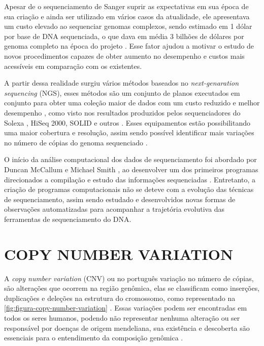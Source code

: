 Apesar de o sequenciamento de Sanger suprir as expectativas em sua época de sua criação e ainda ser utilizado em vários casos da atualidade, ele apresentava um custo elevado ao sequenciar genomas complexos, sendo estimado em 1 dólar por base de DNA sequenciada, o que dava em média 3 bilhões de dólares por genoma completo na época do projeto \cite{HutchisonIII2007}. Esse fator ajudou a motivar o estudo de novos procedimentos capazes de obter aumento no desempenho e custos mais acessíveis em comparação com os existentes.

A partir dessa realidade surgiu vários métodos baseados no \textit{next-genaration sequencing} (NGS), esses métodos são um conjunto de planos executados em conjunto para obter uma coleção maior de dados com um custo reduzido e melhor desempenho \cite{Metzker2010,Zhao2013}, como visto nos resultados produzidos pelos sequenciadores do Solexa \cite{Bennett2004}, HiSeq 2000, SOLID e outros \cite{Edwards2011,Linnarsson2010}. Esses equipamentos estão possibilitando uma maior cobertura e resolução, assim sendo possível identificar mais variações no número de cópias do genoma sequenciado \cite{Zhao2013}.


O início da análise computacional dos dados de sequenciamento foi abordado por Duncan McCallum e Michael Smith \cite{McCallum1977}, ao desenvolver um dos primeiros programas direcionados a compilação e estudo das informações sequenciadas \cite{HutchisonIII2007}. Entretanto, a criação de programas computacionais não se deteve com a evolução das técnicas de sequenciamento, assim sendo estudado e desenvolvidos novas formas de observações automatizadas para acompanhar a trajetória evolutiva das ferramentas de sequenciamento do DNA.


\section{COPY NUMBER VARIATION} 
\label{sec:copyNumberVariation}

A \textit{copy number variation} (CNV) ou no português variação no número de cópias, são alterações que ocorrem na região genômica, elas se classificam como inserções, duplicações e deleções na estrutura do cromossomo, como representado na \autoref{fig:figura-copy-number-variation} \cite{Zhao2013,Redon2006}. Essas variações podem ser encontradas em todos os seres humanos, podendo não representar nenhuma alteração ou ser responsável por doenças de origem mendeliana, sua existência e descoberta são essenciais para o entendimento da composição genômica \cite{Redon2006,Feuk2006}.

